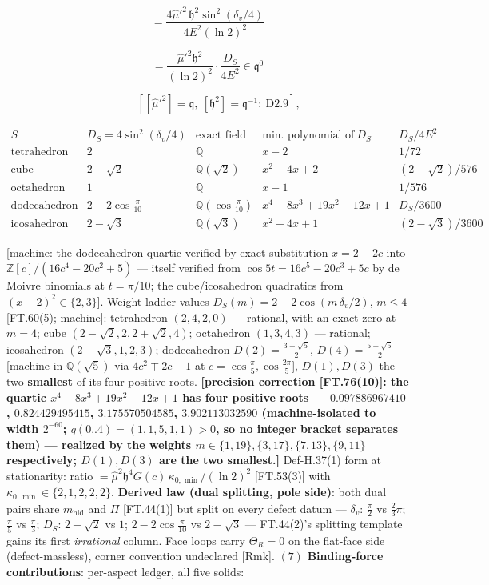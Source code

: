\begin{theorem}
\[
= \frac{4\hat\mu'^2\,\mathfrak h^2\sin^2(\delta_v/4)}{4E^2(\ln2)^2}
\]

\[
= \frac{\hat\mu'^2\mathfrak h^2}{(\ln2)^2}\cdot\frac{D_S}{4E^2}\in\mathfrak q^0
\]

\[
\qquad [[\hat\mu'^2]=\mathfrak q,\ [\mathfrak h^2]=\mathfrak q^{-1}:\ \mathrm{D2.9}],
\]

\[
\begin{array}{c|c|c|c|c}
S & D_S=4\sin^2(\delta_v/4) & \text{exact field} & \text{min. polynomial of}\ D_S & D_S/4E^2\\ \hline
\text{tetrahedron} & 2 & \mathbb Q & x-2 & 1/72\\
\text{cube} & 2-\sqrt2 & \mathbb Q(\sqrt2) & x^2-4x+2 & (2-\sqrt2)/576\\
\text{octahedron} & 1 & \mathbb Q & x-1 & 1/576\\
\text{dodecahedron} & 2-2\cos\tfrac\pi{10} & \mathbb Q(\cos\tfrac\pi{10}) & x^4-8x^3+19x^2-12x+1 & D_S/3600\\
\text{icosahedron} & 2-\sqrt3 & \mathbb Q(\sqrt3) & x^2-4x+1 & (2-\sqrt3)/3600
\end{array}
\]

[machine: the dodecahedron quartic verified by exact substitution $x=2-2c$ into $\mathbb Z[c]/(16c^4-20c^2+5)$ — itself verified from $\cos5t=16c^5-20c^3+5c$ by de Moivre binomials at $t=\pi/10$; the cube/icosahedron quadratics from $(x-2)^2\in\{2,3\}$]. Weight-ladder values $D_S(m)=2-2\cos(m\,\delta_v/2)$, $m\le4$ [FT.60(5); machine]: tetrahedron $(2,4,2,0)$ — rational, with an exact zero at $m{=}4$; cube $(2{-}\sqrt2,2,2{+}\sqrt2,4)$; octahedron $(1,3,4,3)$ — rational; icosahedron $(2{-}\sqrt3,1,2,3)$; dodecahedron $D(2)=\tfrac{3-\sqrt5}2$, $D(4)=\tfrac{5-\sqrt5}2$ [machine in $\mathbb Q(\sqrt5)$ via $4c^2\mp2c-1$ at $c=\cos\tfrac\pi5,\cos\tfrac{2\pi}5$], $D(1),D(3)$ the two \textbf{smallest} of its four positive roots. \textbf{[precision correction [FT.76(10)]: the quartic $x^4-8x^3+19x^2-12x+1$ has four positive roots — $0.097886967410$, $0.824429495415$, $3.175570504585$, $3.902113032590$ (machine-isolated to width $2^{-60}$; $q(0..4)=(1,1,5,1,1)>0$, so no integer bracket separates them) — realized by the weights $m\in\{1,19\},\{3,17\},\{7,13\},\{9,11\}$ respectively; $D(1),D(3)$ are the two smallest.]} Def-H.37(1) form at stationarity: ratio $=\hat\mu^2\mathfrak h^4G(c)\,\kappa_{0,\min}/(\ln2)^2$ [FT.53(3)] with $\kappa_{0,\min}\in\{2,1,2,2,2\}$. \textbf{Derived law (dual splitting, pole side)}: both dual pairs share $m_{\mathrm{hid}}$ and $\Pi$ [FT.44(1)] but split on every defect datum — $\delta_v$: $\tfrac\pi2$ vs $\tfrac23\pi$; $\tfrac\pi5$ vs $\tfrac\pi3$; $D_S$: $2-\sqrt2$ vs $1$; $2-2\cos\tfrac\pi{10}$ vs $2-\sqrt3$ — FT.44(2)'s splitting template gains its first \textit{irrational} column. Face loops carry $\Theta_R=0$ on the flat-face side (defect-massless), corner convention undeclared [Rmk]. $(7)$ \textbf{Binding-force contributions}: per-aspect ledger, all five solids:


\end{theorem}
